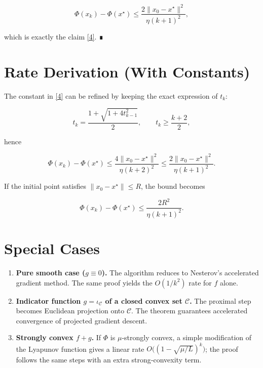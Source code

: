 \documentclass{article}
\begin{document}
\[
\Phi(x_{k})-\Phi(x^{\star})\le \frac{2\|x_{0}-x^{\star}\|^{2}}{\eta (k+1)^{2}}, 
\]

which is exactly the claim \eqref{4}.  ∎

\vspace{0.2cm}
\section*{Rate Derivation (With Constants)}
The constant in \eqref{4} can be refined by keeping the exact expression of $t_{k}$:  

\[
t_{k}= \frac{1+\sqrt{1+4t_{k-1}^{2}}}{2},\qquad 
t_{k}\ge \frac{k+2}{2},
\]

hence  

\[
\Phi(x_{k})-\Phi(x^{\star})\le \frac{4\|x_{0}-x^{\star}\|^{2}}{\eta (k+2)^{2}}
\le \frac{2\|x_{0}-x^{\star}\|^{2}}{\eta (k+1)^{2}} .
\]

If the initial point satisfies $\|x_{0}-x^{\star}\|\le R$, the bound becomes  

\[
\Phi(x_{k})-\Phi(x^{\star})\le \frac{2R^{2}}{\eta (k+1)^{2}} .
\]

\vspace{0.2cm}
\section*{Special Cases}
\begin{enumerate}
\item \textbf{Pure smooth case ($g\equiv0$).}  
The algorithm reduces to Nesterov’s accelerated gradient method. The same proof yields the $O(1/k^{2})$ rate for $f$ alone.
\item \textbf{Indicator function $g=\iota_{\mathcal{C}}$ of a closed convex set $\mathcal{C}$.}  
The proximal step becomes Euclidean projection onto $\mathcal{C}$. The theorem guarantees accelerated convergence of projected gradient descent.
\item \textbf{Strongly convex $f+g$.}  
If $\Phi$ is $\mu$‑strongly convex, a simple modification of the Lyapunov function gives a linear rate $O\bigl((1-\sqrt{\mu/L})^{k}\bigr)$; the proof follows the same steps with an extra strong‑convexity term.
\end{enumerate}
\end{document}
